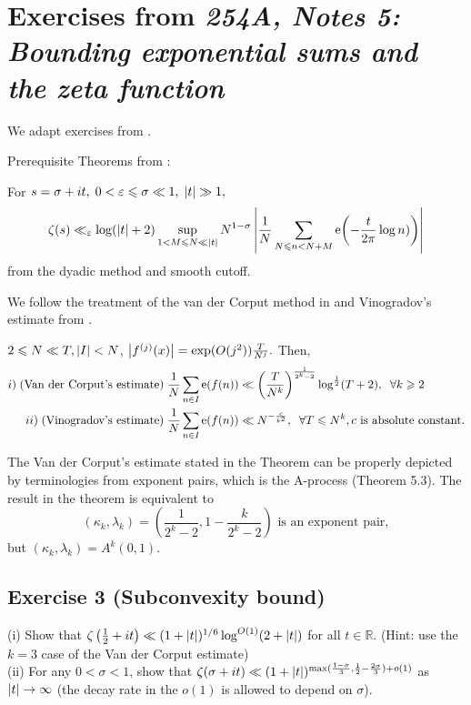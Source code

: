 \section{Exercises from \textit{254A, Notes 5: Bounding exponential sums and the zeta function}}

We adapt exercises from \cite{Tao254ANotes5}.

Prerequisite Theorems from \cite[Proposition 1]{Tao254ANotes5}: 
\begin{theorem}
    For $s = \sigma + it, \; 0 < \varepsilon \leqslant \sigma \ll 1, \; \left\lvert t \right\rvert \gg 1,$ 
    \begin{equation}
        \zeta(s) \ll_\varepsilon \log(\left\lvert t \right\rvert+2) \sup_{1 < M \leqslant N \ll \left\lvert t \right\rvert} N^{1-\sigma} \left\lvert \frac{1}{N} \sum_{N \leqslant n < N+M} \operatorname{e} \! \left( - \frac{t}{2\pi} \log n) \right) \right\rvert
    \end{equation}
    from the dyadic method and smooth cutoff.
\end{theorem}

We follow the treatment of the van der Corput method in \cite[Ch.~1]{GrahamKolesnik} and Vinogradov's estimate from \cite[Theorem 2]{Tao254ANotes5}.
\begin{theorem}
    $2 \leqslant N \ll T, \left\lvert I \right\rvert < N$, $\left\lvert f^{(j)}(x) \right\rvert = \exp(O(j^2))\frac{T}{N^j}.$ Then, 
    \begin{align}
        i) \; \text{(Van der Corput's estimate)} \; \frac{1}{N} \sum_{n \in I} \operatorname{e} \! \left( f(n) \right) &\ll \left( \frac{T}{N^k} \right)^\frac{1}{2^k-2} \log^\frac{1}{2}(T+2), \;\; \forall k \geqslant 2\\
        ii) \; \text{(Vinogradov's estimate)} \; \frac{1}{N} \sum_{n \in I} \operatorname{e} \! \left( f(n) \right) &\ll N^{-\frac{c}{k^2}}, \;\; \forall T \leqslant N^k, c \text{ is absolute constant}.
    \end{align}
\end{theorem}
The Van der Corput's estimate stated in the Theorem can be properly depicted by terminologies from exponent pairs, which is the A-process (Theorem 5.3). The result in the theorem is equivalent to $$(\kappa_k,\lambda_k) = \left( \frac{1}{2^k-2}, 1-\frac{k}{2^k-2} \right) \text{ is an exponent pair},$$ but $(\kappa_k,\lambda_k) = A^k(0, 1).$ 

\subsection{Exercise 3 (Subconvexity bound)}
\begin{theorem}
    (i) Show that $\zeta \left( \frac{1}{2}+it \right) \ll (1+\left\lvert t \right\rvert)^{1/6} \log^{O(1)}(2+\left\lvert t \right\rvert)$ for all $t \in \mathbb{R}$. (Hint: use the $k=3$ case of the Van der Corput estimate) \\
    (ii) For any $0 < \sigma < 1$, show that $\zeta(\sigma+it) \ll (1+\left\lvert t \right\rvert)^{\max( \frac{1-\sigma}{3}, \frac{1}{2} - \frac{2\sigma}{3}) + o(1)}$ as $\left\lvert t \right\rvert \rightarrow \infty$ (the decay rate in the $o(1)$ is allowed to depend on $\sigma$).
\end{theorem}

